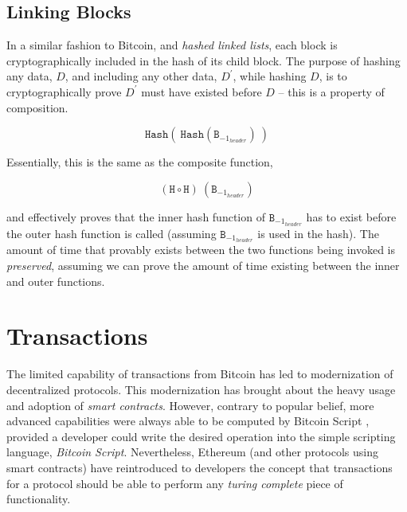 \documentclass[10pt, titlepage, twocolumn]{report}
\begin{document}
\subsection{Linking Blocks}
\hspace*{15pt}
In a similar fashion to Bitcoin, and \textit{hashed linked lists}, each block is cryptographically included in the hash of its child block. The purpose of hashing any data, \(D\), and including any other data, \(D^{\prime}\), while hashing \(D\), is to cryptographically prove \(D^{\prime}\) must have existed before \(D\) -- this is a property of composition. 

\begin{equation}
	\texttt{Hash}( \: \texttt{Hash}(\texttt{B}_{-1_{header}}) \:)
\end{equation}

Essentially, this is the same as the composite function,

\begin{equation}
(\texttt{H} \circ \texttt{H}) \: ( \texttt{B}_{-1_{header}} ) 
\end{equation}

and effectively proves that the inner hash function of \(  \texttt{B}_{-1_{header}} \) has to exist before the outer hash function is called (assuming \( \texttt{B}_{-1_{header}} \) is used in the hash). The amount of time that provably exists between the two functions being invoked is \textit{preserved}, assuming we can prove the amount of time existing between the inner and outer functions.  


\section{Transactions}
\hspace*{15pt}
The limited capability of transactions from Bitcoin has led to modernization of decentralized protocols. This modernization has brought about the heavy usage and adoption of \textit{smart contracts}. However, contrary to popular belief, more advanced capabilities were always able to be computed by Bitcoin Script \cite{BTC}, provided a developer could write the desired operation into the simple scripting language, \textit{Bitcoin Script}. Nevertheless, Ethereum (and other protocols using smart contracts) have reintroduced to developers the concept that transactions for a protocol should be able to perform any \textit{turing complete} piece of functionality. 
\end{document}
